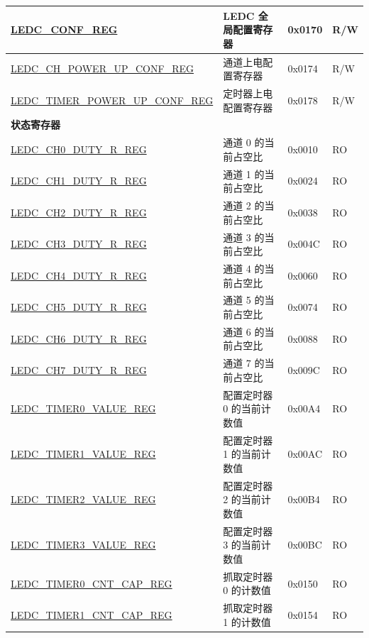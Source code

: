 \begin{longtable}{ | p{6cm} | p{4.5cm} | p{1.3cm} | p{1.7cm} | }
\hyperref[regdesc:LEDCCONFREG]{LEDC\_CONF\_REG} & LEDC 全局配置寄存器 & 0x0170 & R/W \\ \hline
\hyperref[regdesc:LEDCCHPOWERUPCONFREG]{LEDC\_CH\_POWER\_UP\_CONF\_REG} & 通道上电配置寄存器  & 0x0174 & R/W \\ \hline
\hyperref[regdesc:LEDCTIMERPOWERUPCONFREG]{LEDC\_TIMER\_POWER\_UP\_CONF\_REG} & 定时器上电配置寄存器 & 0x0178 & R/W \\ \hline
\multicolumn{4}{|l|}{\textbf{状态寄存器}} \\ \hline
\hyperref[regdesc:LEDCCHNDUTYRREG]{LEDC\_CH0\_DUTY\_R\_REG} & 通道 0 的当前占空比 & 0x0010 & RO \\ \hline
\hyperref[regdesc:LEDCCHNDUTYRREG]{LEDC\_CH1\_DUTY\_R\_REG} & 通道 1 的当前占空比 & 0x0024 & RO \\ \hline
\hyperref[regdesc:LEDCCHNDUTYRREG]{LEDC\_CH2\_DUTY\_R\_REG} & 通道 2 的当前占空比 & 0x0038 & RO \\ \hline
\hyperref[regdesc:LEDCCHNDUTYRREG]{LEDC\_CH3\_DUTY\_R\_REG} & 通道 3 的当前占空比 & 0x004C & RO \\ \hline
\hyperref[regdesc:LEDCCHNDUTYRREG]{LEDC\_CH4\_DUTY\_R\_REG} & 通道 4 的当前占空比 & 0x0060 & RO \\ \hline
\hyperref[regdesc:LEDCCHNDUTYRREG]{LEDC\_CH5\_DUTY\_R\_REG} & 通道 5 的当前占空比 & 0x0074 & RO \\ \hline
\hyperref[regdesc:LEDCCHNDUTYRREG]{LEDC\_CH6\_DUTY\_R\_REG} & 通道 6 的当前占空比 & 0x0088 & RO \\ \hline
\hyperref[regdesc:LEDCCHNDUTYRREG]{LEDC\_CH7\_DUTY\_R\_REG} & 通道 7 的当前占空比 & 0x009C & RO \\ \hline
\hyperref[regdesc:LEDCTIMERXVALUEREG]{LEDC\_TIMER0\_VALUE\_REG} & 配置定时器 0 的当前计数值 & 0x00A4 & RO \\ \hline
\hyperref[regdesc:LEDCTIMERXVALUEREG]{LEDC\_TIMER1\_VALUE\_REG} & 配置定时器 1 的当前计数值 & 0x00AC & RO \\ \hline
\hyperref[regdesc:LEDCTIMERXVALUEREG]{LEDC\_TIMER2\_VALUE\_REG} & 配置定时器 2 的当前计数值 & 0x00B4 & RO \\ \hline
\hyperref[regdesc:LEDCTIMERXVALUEREG]{LEDC\_TIMER3\_VALUE\_REG} & 配置定时器 3 的当前计数值 & 0x00BC & RO \\ \hline
\hyperref[regdesc:LEDCTIMERXCNTCAPREG]{LEDC\_TIMER0\_CNT\_CAP\_REG} & 抓取定时器 0 的计数值 & 0x0150 & RO \\ \hline
\hyperref[regdesc:LEDCTIMERXCNTCAPREG]{LEDC\_TIMER1\_CNT\_CAP\_REG} & 抓取定时器 1 的计数值 & 0x0154 & RO \\ \hline

\end{longtable}
